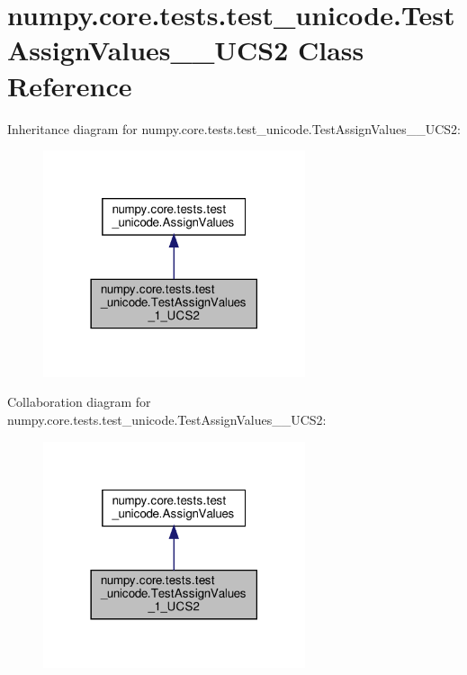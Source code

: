 \hypertarget{classnumpy_1_1core_1_1tests_1_1test__unicode_1_1TestAssignValues__1__UCS2}{}\section{numpy.\+core.\+tests.\+test\+\_\+unicode.\+Test\+Assign\+Values\+\_\+\_\+\+U\+C\+S2 Class Reference}
\label{classnumpy_1_1core_1_1tests_1_1test__unicode_1_1TestAssignValues__1__UCS2}


Inheritance diagram for numpy.\+core.\+tests.\+test\+\_\+unicode.\+Test\+Assign\+Values\+\_\+\_\+\+U\+C\+S2\+:
\nopagebreak
\begin{figure}[H]
\begin{center}
\leavevmode
\includegraphics[width=218pt]{classnumpy_1_1core_1_1tests_1_1test__unicode_1_1TestAssignValues__1__UCS2__inherit__graph}
\end{center}
\end{figure}


Collaboration diagram for numpy.\+core.\+tests.\+test\+\_\+unicode.\+Test\+Assign\+Values\+\_\+\_\+\+U\+C\+S2\+:
\nopagebreak
\begin{figure}[H]
\begin{center}
\leavevmode
\includegraphics[width=218pt]{classnumpy_1_1core_1_1tests_1_1test__unicode_1_1TestAssignValues__1__UCS2__coll__graph}
\end{center}
\end{figure}
